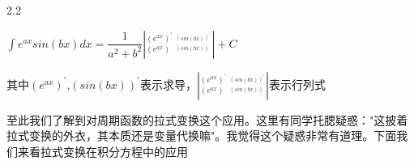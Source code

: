 \documentclass[12pt]{report}
\begin{document}
  \vspace{-7pt}
  
  \begin{spacing}{2.2}
  	 \begin{center}
  		$\int e^{ax}sin\left(bx\right)dx=\dfrac{1}{a^{2}+b^{2}}\left|_{\left(e^{ax}\right)}^{\left(e^{ax}\right)^{\prime}}\:_{^{\left(sin\left(bx\right)\right)}}^{^{\left(sin\left(bx\right)\right)^{\prime}}}\right|+C$ 
  		
  		其中$\left(e^{ax}\right)^{\prime}$,$\left(sin\left(bx\right)\right)^{\prime}$表示求导，$\left|_{\left(e^{ax}\right)}^{\left(e^{ax}\right)^{\prime}}\:_{^{\left(sin\left(bx\right)\right)}}^{^{\left(sin\left(bx\right)\right)^{\prime}}}\right|$表示行列式
  	\end{center}
  \end{spacing}
 
  至此我们了解到对周期函数的拉式变换这个应用。这里有同学托腮疑惑："这披着拉式变换的外衣，其本质还是变量代换嘛"。我觉得这个疑惑非常有道理。下面我们来看拉式变换在积分方程中的应用
  
  
  
   
% 		
% 		
 

   
   
   \clearpage %
   
\end{document}
